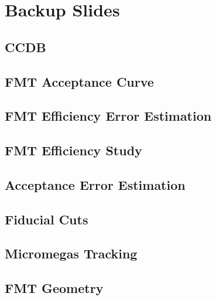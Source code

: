 \section*{Backup Slides}
\begin{frame}{}
    \centering \Huge{}
\end{frame}

\subsection*{CCDB}


\subsection*{FMT Acceptance Curve}


\subsection*{FMT Efficiency Error Estimation}


\subsection*{FMT Efficiency Study}


\subsection*{Acceptance Error Estimation}


\subsection*{Fiducial Cuts}


\subsection*{Micromegas Tracking}


\subsection*{FMT Geometry}


